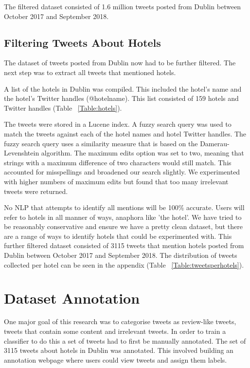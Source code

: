 The filtered dataset consisted of 1.6 million tweets posted from Dublin between October 2017 and September 2018.

\subsection{Filtering Tweets About Hotels}

The dataset of tweets posted from Dublin now had to be further filtered. The next step was to extract all tweets that mentioned hotels.

A list of the hotels in Dublin was compiled. This included the hotel's name and the hotel's Twitter handles (@hotelname). This list consisted of 159 hotels and Twitter handles (Table ~\ref{Table:hotels}).

The tweets were stored in a Lucene index. A fuzzy search query was used to match the tweets against each of the hotel names and hotel Twitter handles. The fuzzy search query uses a similarity measure that is based on the Damerau-Levenshtein algorithm. The maximum edits option was set to two, meaning that strings with a maximum difference of two characters would still match. This accounted for misspellings and broadened our search slightly. We experimented with higher numbers of maximum edits but found that too many irrelevant tweets were returned.

No NLP that attempts to identify all mentions will be 100\% accurate. Users will refer to hotels in all manner of ways, anaphora like 'the hotel'. We have tried to be reasonably conservative and ensure we have a pretty clean dataset, but there are a range of ways to identify hotels that could be experimented with. 
This further filtered dataset consisted of 3115 tweets that mention hotels posted from Dublin between October 2017 and September 2018. The distribution of tweets collected per hotel can be seen in the appendix (Table ~\ref{Table:tweetsperhotels}).

\section{Dataset Annotation}

One major goal of this research was to categorise tweets as review-like tweets, tweets that contain some content and irrelevant tweets. In order to train a classifier to do this a set of tweets had to first be manually annotated. The set of 3115 tweets about hotels in Dublin was annotated. This involved building an annotation webpage where users could view tweets and assign them labels.

